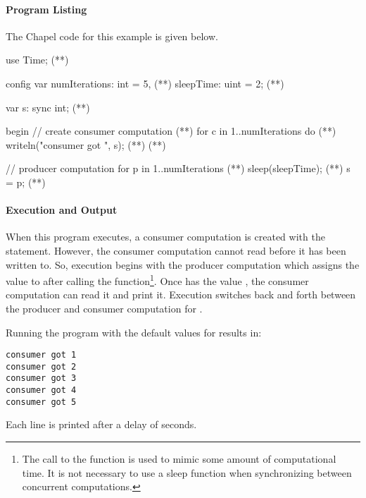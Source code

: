 \paragraph{Program Listing}
The Chapel code for this example is given below.

\begin{numberedchapel}
use Time;                           (*\label{use_time}*)

config var numIterations: int = 5,  (*\label{prodcons_var_1}*)
           sleepTime: uint = 2;     (*\label{prodcons_var_2}*)

var s: sync int;                    (*\label{prodcons_var_3}*)

begin { // create consumer computation (*\label{consumer_start}*)
  for c in 1..numIterations do         (*\label{consumer_for_1}*)
    writeln("consumer got ", s);       (*\label{consumer_for_2}*)
}                                      (*\label{consumer_end}*)

// producer computation
for p in 1..numIterations {            (*\label{producer_start}*)
  sleep(sleepTime);   (*\label{sleep_call}*)
  s = p;
}                                      (*\label{producer_end}*)
\end{numberedchapel}

\paragraph{Execution and Output}
When this program executes, a consumer computation is created with the 
statement.
However, the consumer computation cannot read  before it has been written
to.  So, execution begins with the producer computation which assigns the value
 to  after calling the  function\footnote{The call to
the  function 
is used to mimic some amount of computational time.  It is not necessary to use
a sleep function when synchronizing between concurrent computations.}.   
Once  has the
value , the consumer computation can read it and print it.  Execution
switches back and forth between the producer and consumer computation for
.

Running the program with the default
values for  results in:
{\small
\begin{verbatim}
consumer got 1
consumer got 2
consumer got 3
consumer got 4
consumer got 5
\end{verbatim}}
Each line is printed after a delay of  seconds.

